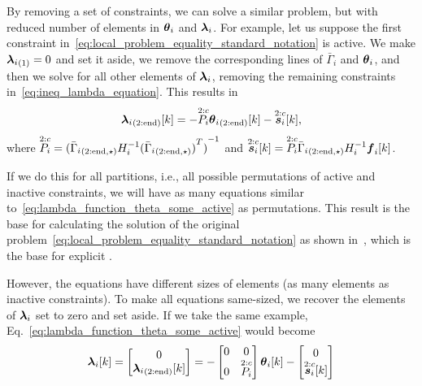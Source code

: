 \documentclass[../main.tex]{subfiles}
\begin{document}
By removing a set of constraints, we can solve a similar problem, but with reduced number of elements in $\thetai$ and $\lambdai$.
For example, let us suppose the first constraint in~\eqref{eq:local_problem_equality_standard_notation} is active.
We make $\elem[1]{\lambdai}=0$ and set it aside, we remove the corresponding lines of $\bar{\Gamma}_{i}$ and $\thetai$, and then we solve for all other elements of $\lambdai$, removing the remaining constraints in~\eqref{eq:ineq_lambda_equation}. This results in
\begin{equation}
  \label{eq:lambda_function_theta_some_active}
  \elem[2:\elemend]{\lambdai}[k]=-\Plinineqnonzero[2:c] \elem[2:\elemend]{\thetai}[k]-\sikineqnonzero[2:c],
\end{equation}
where $\Plinineqnonzero[2:c]={(\linearcoefiineqnonzero[2:\elemend,\star])}^{-1}$ and $\sikineqnonzero[2:c]=\Plinineqnonzero[2:c]\elem[2:\elemend,\star]{\bar{\Gamma}_{i}}H_{i}^{-1}\vec{f}_{i}[k]$.

If we do this for all partitions, i.e., all possible permutations of active and inactive constraints, we will have as many equations similar to~\eqref{eq:lambda_function_theta_some_active} as permutations.
This result is the base for calculating the solution of the original problem~\eqref{eq:local_problem_equality_standard_notation} as shown in~\cite{BemporadEtAl2002,AlessioBemporad2009}, which is the base for explicit \mpc{}.

However, the equations have different sizes of elements (as many elements as inactive constraints).
To make all equations same-sized, we recover the elements of $\lambdai$ set to zero and set aside.
If we take the same example, Eq.~\eqref{eq:lambda_function_theta_some_active} would become
\begin{equation}
  \label{eq:lambda_function_theta_some_active_same_size}
  \lambdaik=
  \left[
    \begin{matrix}
      0\\
      \elem[2:\elemend]{\lambdai}[k]
    \end{matrix}
  \right]
  =
  -
  \left[
    \begin{matrix}
      0&0\\
      0&\Plinineqnonzero[2:c]
    \end{matrix}
  \right]
  \thetaik
  -
  \left[
    \begin{matrix}
      0\\
      \sikineqnonzero[2:c]
    \end{matrix}
  \right]
\end{equation}
\end{document}
